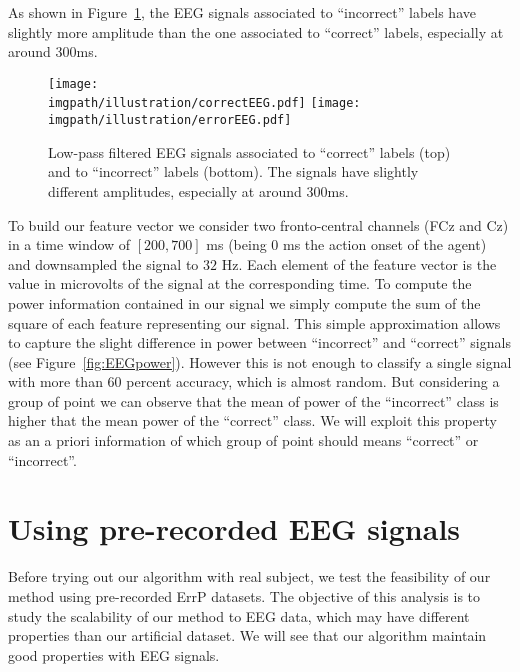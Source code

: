 As shown in Figure~\ref{fig:EEGsample}, the EEG signals associated to ``incorrect'' labels have slightly more amplitude than the one associated to ``correct'' labels, especially at around 300ms.

\begin{figure}[!htbp]
\centering
\texttt{[image: \\imgpath/illustration/correctEEG.pdf]}
\texttt{[image: \\imgpath/illustration/errorEEG.pdf]}
\caption{Low-pass filtered EEG signals associated to ``correct'' labels (top) and to ``incorrect'' labels (bottom).  The signals have slightly different amplitudes, especially at around 300ms. }
\label{fig:EEGsample}
\end{figure}

To build our feature vector we consider two fronto-central channels (FCz and Cz) in a time window of $[200,700]$ ms (being 0 ms the action onset of the agent) and downsampled the signal to $32$ Hz. Each element of the feature vector is the value in microvolts of the signal at the corresponding time. To compute the power information contained in our signal we simply compute the sum of the square of each feature representing our signal. This simple approximation allows to capture the slight difference in power between ``incorrect'' and ``correct'' signals (see Figure~\ref{fig:EEGpower}). However this is not enough to classify a single signal with more than 60 percent accuracy, which is almost random. But considering a group of point we can observe that the mean of power of the ``incorrect'' class is higher that the mean power of the ``correct'' class. We will exploit this property as an a priori information of which group of point should means ``correct'' or ``incorrect''.

\section{Using pre-recorded EEG signals}
\label{chapter:bci:EEGsignals}

Before trying out our algorithm with real subject, we test the feasibility of our method using pre-recorded ErrP datasets. The objective of this analysis is to study the scalability of our method to EEG data, which may have different properties than our artificial dataset. We will see that our algorithm maintain good properties with EEG signals.


